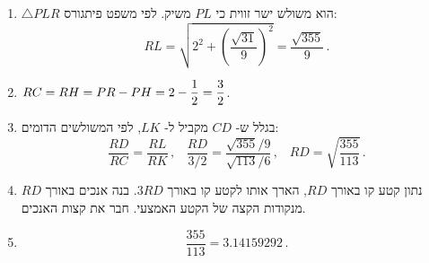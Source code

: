 \begin{enumerate}
\item $\triangle PLR$
הוא משולש ישר זווית כי
$PL$
משיק. לפי משפט פיתגורס:
\[
RL=\sqrt{2^2+\left(\frac{\sqrt{31}}{9}\right)^2} = \frac{\sqrt{355}}{9}\,.
\]

\item $RC=RH=PR-PH=2-\displaystyle\frac{1}{2}=\frac{3}{2}$.

\item 
בגלל ש-%
$CD$
מקביל ל-%
$LK$,
לפי המשולשים הדומים:
\[
\frac{RD}{RC}=\frac{RL}{RK}\,,\;\;\;\frac{RD}{3/2}=\frac{\sqrt{355}/9}{\sqrt{113}/6}\,,\;\;\;RD=\sqrt{\frac{355}{113}}\,.
\]
\item
נתון קטע קו באורך
$RD$,
הארך אותו לקטע קו באורך
$3RD$.
בנה אנכים באורך
$RD$
מנקודות הקצה של הקטע האמצעי. חבר את קצות האנכים.
\begin{center}
\end{center}

\item \mbox{}
\[
\frac{355}{113}=3.14159292\,.
\]

\end{enumerate}

